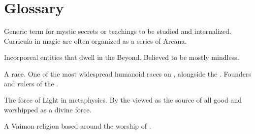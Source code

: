 \documentclass
  [a4paper,
   12pt,
   oneside
  ]%
  {article}
\begin{document}
\section{Glossary}
\begin{gloss}



\begin{comment}
\paragraph{Arcanum}
\end{comment}
Generic term for mystic secrets or teachings to be studied and internalized. 
Curricula in magic are often organized as a series of Arcana.  



\begin{comment}
\paragraph{\daemon}
\end{comment}
\gitem[\daemons]{\daemon}
Incorporeal entities that dwell in the Beyond. 
Believed to be mostly mindless. 




\begin{comment}
\paragraph{\human}
\end{comment}
\gitem{\human}
A  race. 
One of the most widespread humanoid races on \Miith{}, alongside the \scathae. 
Founders and rulers of the \VaimonCaliphate. 



\begin{comment}
\subsection{\iquin}
\end{comment}
\gitem{\iquin}
The force of Light in  metaphysics. 
By the  viewed as the source of all good and worshipped as a divine force. 



\begin{comment}
\paragraph{\Iquinian Church}
\end{comment}
A Vaimon religion based around the worship of . 




\end{gloss}
\end{document}
